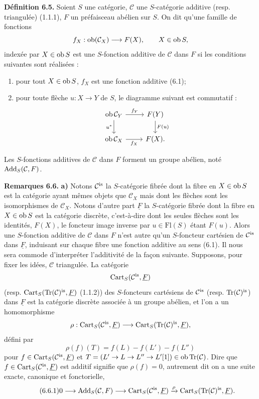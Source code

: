 \documentclass[11pt]{article}
\begin{document}
\textbf{Définition 6.5.} Soient \(S\) une catégorie, \(\mathcal C\) une \(S\)-catégorie additive (resp. triangulée) (1.1.1), \(F\) un préfaisceau abélien sur \(S\). On dit qu'une famille de fonctions
\[
  f_X:\operatorname{ob}(\mathcal C_X)\longrightarrow F(X),
  \qquad X\in\operatorname{ob} S,
\]
indexée par \(X\in\operatorname{ob} S\) est une \(S\)-fonction additive de \(\mathcal C\) dans \(F\) si les conditions suivantes sont réalisées :
\begin{enumerate}[label=(\roman*)]
\item pour tout \(X\in\operatorname{ob} S\), \(f_X\) est une fonction additive (6.1);
\item pour toute flèche \(u:X\to Y\) de \(S\), le diagramme suivant est commutatif :
\[
\begin{tikzcd}
\Ob\mathcal C_Y \arrow[r,"f_Y"] \arrow[d,"u^*"'] & F(Y) \arrow[d,"F(u)"]\\
\Ob\mathcal C_X \arrow[r,"f_X"'] & F(X).
\end{tikzcd}
\]
\end{enumerate}
Les \(S\)-fonctions additives de \(\mathcal C\) dans \(F\) forment un groupe abélien, noté \(\operatorname{Add}_S(\mathcal C,F)\).

\textbf{Remarques 6.6.} \textbf{a)} Notons \(\mathcal C^{\mathrm{is}}\) la \(S\)-catégorie fibrée dont la fibre en \(X\in\operatorname{ob} S\) est la catégorie ayant mêmes objets que \(\mathcal C_X\) mais dont les flèches sont les isomorphismes de \(\mathcal C_X\). Notons d'autre part \(\underline F\) la \(S\)-catégorie fibrée dont la fibre en \(X\in\operatorname{ob} S\) est la catégorie discrète, c'est-à-dire dont les seules flèches sont les identités, \(F(X)\), le foncteur image inverse par \(u\in\mathrm{Fl}(S)\) étant \(F(u)\). Alors une \(S\)-fonction additive de \(\mathcal C\) dans \(F\) n'est autre qu'un \(S\)-foncteur cartésien de \(\mathcal C^{\mathrm{is}}\) dans \(\underline F\), induisant sur chaque fibre une fonction additive au sens (6.1). Il nous sera commode d'interpréter l'additivité de la façon suivante. Supposons, pour fixer les idées, \(\mathcal C\) triangulée. La catégorie
\[
  \operatorname{Cart}_S(\mathcal C^{\mathrm{is}},\underline F)
\]
(resp. \(\operatorname{Cart}_S(\operatorname{Tr}(\mathcal C)^{\mathrm{is}},\underline F)\) (1.1.2)) des \(S\)-foncteurs cartésiens de \(\mathcal C^{\mathrm{is}}\) (resp. \(\operatorname{Tr}(\mathcal C)^{\mathrm{is}}\)) dans \(\underline F\) est la catégorie discrète associée à un groupe abélien, et l'on a un homomorphisme
\[
  \rho:\operatorname{Cart}_S(\mathcal C^{\mathrm{is}},\underline F)
  \longrightarrow
  \operatorname{Cart}_S(\operatorname{Tr}(\mathcal C)^{\mathrm{is}},\underline F),
\]
défini par
\[
  \rho(f)(T)=f(L)-f(L')-f(L'')
\]
pour \(f\in\operatorname{Cart}_S(\mathcal C^{\mathrm{is}},\underline F)\) et \(T=(L'\to L\to L''\to L'[1])\in\operatorname{ob}\operatorname{Tr}(\mathcal C)\). Dire que \(f\in\operatorname{Cart}_S(\mathcal C^{\mathrm{is}},\underline F)\) est additif signifie que \(\rho(f)=0\), autrement dit on a une suite exacte, canonique et fonctorielle,
\begin{equation}\tag{6.6.1}
  0\longrightarrow \operatorname{Add}_S(\mathcal C,F)
  \longrightarrow \operatorname{Cart}_S(\mathcal C^{\mathrm{is}},\underline F)
  \xrightarrow{\rho}
  \operatorname{Cart}_S(\operatorname{Tr}(\mathcal C)^{\mathrm{is}},\underline F).
\end{equation}
\end{document}
